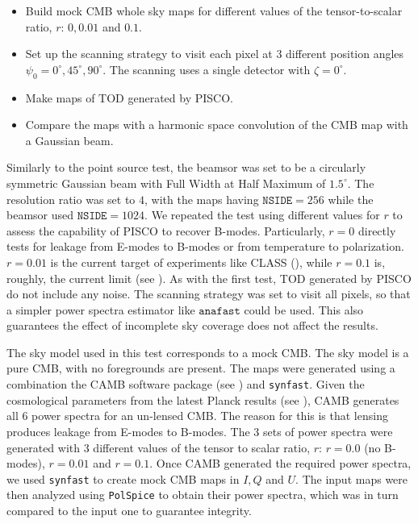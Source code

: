 \documentclass[a4paper,11pt]{article}
\begin{document}
\begin{itemize}
	\item Build mock CMB whole sky maps for different values of the tensor-to-scalar ratio, $r$: $0, 0.01$ and $0.1$.
	\item Set up the scanning strategy to visit each pixel at 3 different position angles $\psi_0 = 0^{\circ},45^{\circ},90^{\circ}$. The scanning uses a single detector with $\zeta=0^\circ$.
	\item Make maps of TOD generated by PISCO. 
	\item Compare the maps with a harmonic space convolution of the CMB map with a Gaussian beam.
\end{itemize}

Similarly to the point source test, the beamsor was set to be a circularly symmetric Gaussian beam with Full Width at Half Maximum of $1.5^\circ$. The resolution ratio was set to $4$, with the maps having $\mathrm{\texttt{NSIDE}} = 256$ while the beamsor used $\mathrm{\texttt{NSIDE}} = 1024$. We repeated the test using different values for $r$ to assess the capability of PISCO to recover B-modes. Particularly, $r=0$ directly tests for leakage from E-modes to B-modes or from temperature to polarization. $r=0.01$ is the current target of experiments like CLASS (\cite{2016SPIE.9914E..1KH}), while $r=0.1$ is, roughly, the current limit (see \cite{2018PhRvL.121v1301B}). As with the first test, TOD generated by PISCO do not include any noise. The scanning strategy was set to visit all pixels, so that a simpler power spectra estimator like $\texttt{anafast}$ could be used. This also guarantees the effect of incomplete sky coverage does not affect the results. 

The sky model used in this test corresponds to a mock CMB. The sky model is a pure CMB, with no foregrounds are present. The maps were generated using a combination the CAMB software package (see \cite{Lewis:2002ah}) and \texttt{synfast}. Given the cosmological parameters from the latest Planck results (see \cite{2016A&A...594A..13P}), CAMB generates all 6 power spectra for an un-lensed CMB. The reason for this is that lensing produces leakage from E-modes to B-modes. The 3 sets of power spectra were generated with 3 different values of the tensor to scalar ratio, $r$: $r=0.0$ (no B-modes), $r=0.01$ and $r=0.1$. Once CAMB generated the required power spectra, we used \texttt{synfast} to create mock CMB maps in $I,Q$ and $U$. The input maps were then analyzed using \texttt{PolSpice} to obtain their power spectra, which was in turn compared to the input one to guarantee integrity.
\end{document}
